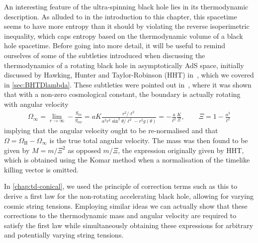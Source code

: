 \documentclass[
twoside,
openright,
frontopenright
]{dmathesis}
\begin{document}
An interesting feature of the ultra-spinning black hole lies in its
thermodynamic description. As alluded to in the introduction to this chapter,
this spacetime seems to have more entropy than it should by violating the
reverse isoperimetric inequality, which caps entropy based on the thermodynamic
volume of a black hole spacetime. Before going into more detail, it will be
useful to remind ourselves of some of the subtleties introduced when discussing
the thermodynamics of a rotating black hole in asymptotically AdS space,
initially discussed by Hawking, Hunter and Taylor-Robinson (HHT)
in~\cite{Hawking:1998kw}, which we covered in \cref{sec:BHTDlambda}. These
subtleties were pointed out in~\cite{Caldarelli:1999xj,Gibbons:2004ai}, where it
was shown that with a non-zero cosmological constant, the boundary is actually
rotating with angular velocity
\begin{align}
\Omega_\infty = \lim_{r\to\infty} -\frac{g_{t\phi}}{g_{\phi\phi}} = aK
  \frac{r^2/\ell^2}{a^2 r^2 \sin^2\theta/\ell^2- r^2 g(\theta)} = -
  \frac{a}{\ell^2} \frac{K}{\Xi}, \qquad \Xi = 1-\frac{a^2}{\ell^2}
\end{align}
implying that the angular velocity ought to be re-normalised and that
$\Omega = \Omega_\mathrm{H} - \Omega_\infty$ is the true total angular
velocity. The mass was then found to be given by $M=m/\Xi^2$ as opposed $m/\Xi$,
the expression originally given by HHT, which is obtained using the Komar method
when a normalisation of the timelike killing vector is omitted.

In \cref{chap:td-conical}, we used the principle of correction terms such as
this to derive a first law for the non-rotating accelerating black hole,
allowing for varying cosmic string tensions. Employing similar ideas we can
actually show that these corrections to the thermodynamic mass and angular
velocity are required to satisfy the first law while simultaneously obtaining
these expressions for arbitrary and potentially varying string tensions.
\end{document}
